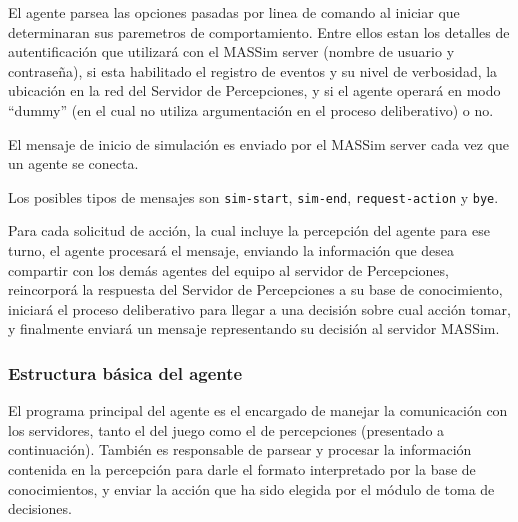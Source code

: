  El agente parsea las opciones pasadas por linea de comando al iniciar 
 que determinaran sus paremetros de comportamiento.
 Entre ellos estan los detalles de autentificación que utilizará con 
 el MASSim server (nombre de usuario y contraseña), si esta habilitado 
 el registro de eventos y su nivel de verbosidad, la ubicación en la 
 red del Servidor de Percepciones, y si el agente operará en modo 
 ``dummy'' (en el cual no utiliza argumentación en el proceso 
 deliberativo) o no. 

 El mensaje de inicio de simulación es enviado por el MASSim server 
 cada vez que un agente se conecta.  
 
 Los posibles tipos de mensajes son \texttt{sim-start}, \texttt{sim-end}, 
 \texttt{request-action} y \texttt{bye}. 

 Para cada solicitud de acción, la cual incluye la percepción del 
 agente para ese turno, el agente procesará el mensaje, enviando la 
 información que desea compartir con los demás agentes del equipo al 
 servidor de Percepciones, reincorporá la respuesta del 
 Servidor de Percepciones a su base de conocimiento, iniciará el 
 proceso deliberativo para llegar a una decisión sobre cual acción 
 tomar, y finalmente enviará un mensaje representando su decisión al 
 servidor MASSim.   

\subsubsection{Estructura básica del agente}
 \label{subsub:estructura_basica_de_agente}
  
 El programa principal del agente es el encargado de manejar la
 comunicación con los servidores, tanto el del juego como el de
 percepciones (presentado a continuación).
 También es responsable de parsear y procesar la información contenida
 en la percepción para darle el formato interpretado por la base de
 conocimientos, y enviar la acción que ha sido elegida por el módulo
 de toma de decisiones.
 
